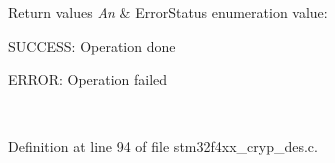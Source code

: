 \begin{DoxyRetVals}{Return values}
{\em An} & Error\-Status enumeration value\-:
\begin{DoxyItemize}
\item S\-U\-C\-C\-E\-S\-S\-: Operation done
\item E\-R\-R\-O\-R\-: Operation failed 
\end{DoxyItemize}\\
\hline
\end{DoxyRetVals}


Definition at line 94 of file stm32f4xx\-\_\-cryp\-\_\-des.\-c.

